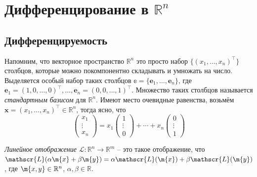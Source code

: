 \chapter{Дифференцирование в $\mathbb{R}^n$}


\section{Дифференцируемость}

Напомним, что векторное пространство $\mathbb{R}^n$ это просто набор $\{(x_1,\ldots, x_n)^\top\}$ столбцов, которые можно покомпонентно складывать и умножать на число. Выделяется особый набор таких столбцов $\mathbb{e} = \{\mathbf{e}_1, \ldots, \mathbf{e}_n\}$, где $\mathbf{e}_1 = (1,0, \ldots, 0)^\top, \ldots, \mathbf{e}_n = (0,0,\ldots, 1)^\top$. Множество таких столбцов называется \textit{стандартным базисом} для $\mathbb{R}^n$. Имеют место очевидные равенства, возьмём $\mathbf{x} = (x_1,\ldots, x_n)^\top \in \mathbb{R}^n$, тогда ясно, что 
\[
\begin{pmatrix}
    x_1 \\ \vdots \\x_n 
\end{pmatrix} = x_1 \begin{pmatrix}
    1 \\ \vdots \\ 0
\end{pmatrix} + \cdots + x_n \begin{pmatrix}
    0 \\ \vdots \\1
\end{pmatrix}
\]

\textit{Линейное отображение} $\mathscr{L}:\mathbb{R}^n \to \mathbb{R}^m$ -- это такое отображение, что $\mathscr{L}(\alpha \m{x} +\beta \m{y} ) = \alpha \mathscr{L}(\m{x}) +\beta \mathscr{L}(\m{y})$, где $\m{x,y} \in \mathbb{R}^n$, $\alpha, \beta \in \mathbb{R}.$ 

